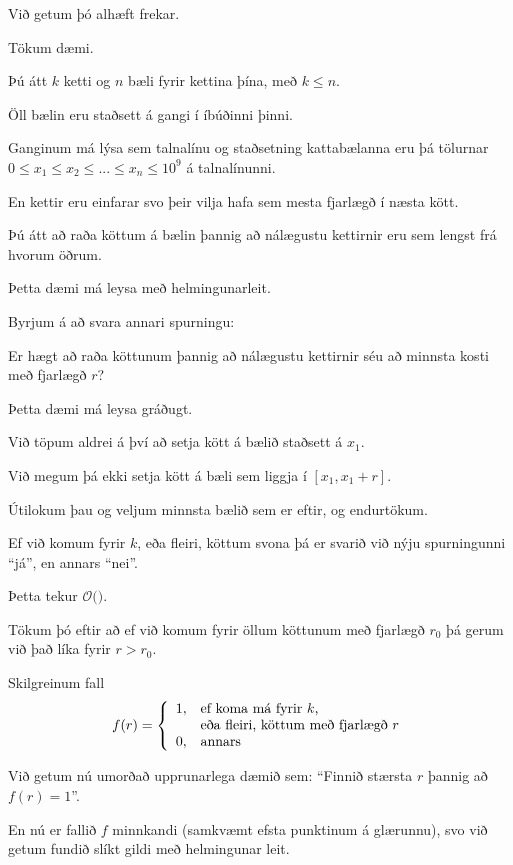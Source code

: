 {
	{
		\item<1-> Við getum þó alhæft frekar.
		\item<2-> Tökum dæmi.
		\item<3-> Þú átt $k$ ketti og $n$ bæli fyrir kettina þína, með $k \leq n$.
		\item<4-> Öll bælin eru staðsett á gangi í íbúðinni þinni.
		\item<5-> Ganginum má lýsa sem talnalínu og staðsetning kattabælanna eru þá tölurnar 
					$0 \leq x_1 \leq x_2 \leq ... \leq x_n \leq 10^9$ á talnalínunni.
		\item<6-> En kettir eru einfarar svo þeir vilja hafa sem mesta fjarlægð í næsta kött.
		\item<7-> Þú átt að raða köttum á bælin þannig að nálægustu kettirnir eru sem lengst frá hvorum öðrum.
	}
}

{
	{
		\item<1-> Þetta dæmi má leysa með helmingunarleit.
		\item<2-> Byrjum á að svara annari spurningu:
		{
			\item<3-> Er hægt að raða köttunum þannig að nálægustu kettirnir séu að minnsta kosti með fjarlægð $r$?
		}
		\item<4-> Þetta dæmi má leysa gráðugt.
		\item<5-> Við töpum aldrei á því að setja kött á bælið staðsett á $x_1$.
		\item<6-> Við megum þá ekki setja kött á bæli sem liggja í $[x_1, x_1 + r]$.
		\item<7-> Útilokum þau og veljum minnsta bælið sem er eftir, og endurtökum.
		\item<8-> Ef við komum fyrir $k$, eða fleiri, köttum svona þá er svarið við nýju spurningunni ``já'', en annars ``nei''.
		\item<9-> Þetta tekur $\mathcal{O}($\onslide<10->{$\,n\,$}$)$.
	}
}

{
	{
		\item<1-> Tökum þó eftir að ef við komum fyrir öllum köttunum með fjarlægð $r_0$ þá gerum við það líka fyrir $r > r_0$.
		\item<2-> Skilgreinum fall
		\[
			f(r) = \left \{ \begin{array}{l l}
			1, & \text{ef koma má fyrir $k$,}\\
			  & \text{eða fleiri, köttum með fjarlægð $r$}\\
			0, & \text{annars}
			\end{array}
			\right .
		\]
		\item<3-> Við getum nú umorðað upprunarlega dæmið sem: ``Finnið stærsta $r$ þannig að $f(r) = 1$''.
		\item<4-> En nú er fallið $f$ minnkandi (samkvæmt efsta punktinum á glærunnu), svo við getum fundið slíkt gildi með helmingunar leit.
	}
}

